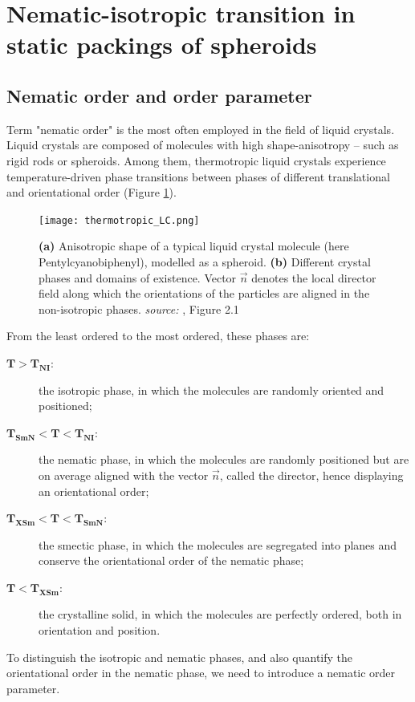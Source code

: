 \documentclass[class=article, float=false, crop=false]{standalone}
\begin{document}
\section{Nematic-isotropic transition in static packings of spheroids}
\label{sec:nematic-isotropic}

\subsection{Nematic order and order parameter}

Term "nematic order" is the most often employed in the field of liquid crystals. Liquid crystals are composed of molecules with high shape-anisotropy -- such as rigid rods or spheroids. Among them, thermotropic liquid crystals experience temperature-driven phase transitions between phases of different translational and orientational order (Figure \ref{thermotropic_LC}). \cite{sengupta2013topological}
\vspace{30pt}

\begin{figure}[h!]
\centering
\texttt{[image: thermotropic\_LC.png]}
\caption{\textbf{(a)} Anisotropic shape of a typical liquid crystal molecule (here Pentylcyanobiphenyl), modelled as a spheroid. \textbf{(b)} Different crystal phases and domains of existence. Vector $\vec{n}$ denotes the local director field along which the orientations of the particles are aligned in the non-isotropic phases. \textit{source:} \cite{sengupta2013topological}, Figure 2.1}
\label{thermotropic_LC}
\end{figure}

From the least ordered to the most ordered, these phases are:
\begin{description}
\item[$\bm{T > T_{NI}}$:] the isotropic phase, in which the molecules are randomly oriented and positioned;
\item[$\bm{T_{SmN} < T < T_{NI}}$:] the nematic phase, in which the molecules are randomly positioned but are on average aligned with the vector $\vec{n}$, called the director, hence displaying an orientational order;
\item[$\bm{T_{XSm} < T < T_{SmN}}$:] the smectic phase, in which the molecules are segregated into planes and conserve the orientational order of the nematic phase;
\item[$\bm{T < T_{XSm}}$:] the crystalline solid, in which the molecules are perfectly ordered, both in orientation and position.
\end{description}
To distinguish the isotropic and nematic phases, and also quantify the orientational order in the nematic phase, we need to introduce a nematic order parameter.\\
\end{document}
